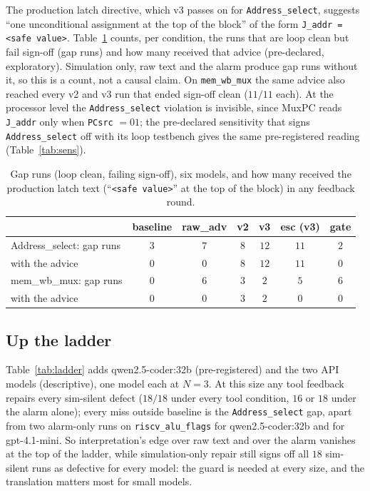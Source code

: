 \documentclass[11pt]{article}
\begin{document}
The production latch directive, which v3 passes on for \texttt{Address\_select},
suggests ``one unconditional assignment at the top of the block'' of the form
\texttt{J\_addr = <safe value>}. Table~\ref{tab:advice} counts, per condition,
the runs that are loop clean but fail sign-off (gap runs) and how many received
that advice (pre-declared, exploratory). Simulation only, raw text and the
alarm produce gap runs without it, so this is a count, not a causal claim. On
\texttt{mem\_wb\_mux} the same advice also reached every v2 and v3 run that
ended sign-off clean ($11/11$ each). At the processor level the
\texttt{Address\_select} violation is invisible, since MuxPC reads
\texttt{J\_addr} only when \texttt{PCsrc} $= 01$; the pre-declared sensitivity
that signs \texttt{Address\_select} off with its loop testbench gives the same
pre-registered reading (Table~\ref{tab:sens}).

\begin{table}[htbp]
\centering
\caption{Gap runs (loop clean, failing sign-off), six models, and how many
received the production latch text (``\texttt{<safe value>}'' at the top of
the block) in any feedback round.}
\label{tab:advice}
\small
\begin{tabular}{@{}l c c c c c c@{}}
\toprule
 & \textbf{baseline} & \textbf{raw\_adv} & \textbf{v2} & \textbf{v3} & \textbf{esc (v3)} & \textbf{gate} \\
\midrule
Address\_select: gap runs       & $3$ & $7$ & $8$ & $12$ & $11$ & $2$ \\
\quad with the advice           & $0$ & $0$ & $8$ & $12$ & $11$ & $0$ \\
mem\_wb\_mux: gap runs          & $0$ & $6$ & $3$ & $2$  & $5$  & $6$ \\
\quad with the advice           & $0$ & $0$ & $3$ & $2$  & $0$  & $0$ \\
\bottomrule
\end{tabular}
\end{table}

\subsection{Up the ladder}
\label{sec:res-ladder}

Table~\ref{tab:ladder} adds qwen2.5-coder:32b (pre-registered) and the two API
models (descriptive), one model each at $N{=}3$. At this size any tool feedback
repairs every sim-silent defect ($18/18$ under every tool condition, $16$ or
$18$ under the alarm alone); every miss outside baseline is the
\texttt{Address\_select} gap, apart from two alarm-only runs on
\texttt{riscv\_alu\_flags} for qwen2.5-coder:32b and for gpt-4.1-mini. So
interpretation's edge over raw text and over the alarm vanishes at the top of
the ladder, while simulation-only repair still signs off all $18$ sim-silent
runs as defective for every model: the guard is needed at every size, and the
translation matters most for small models.
\end{document}
